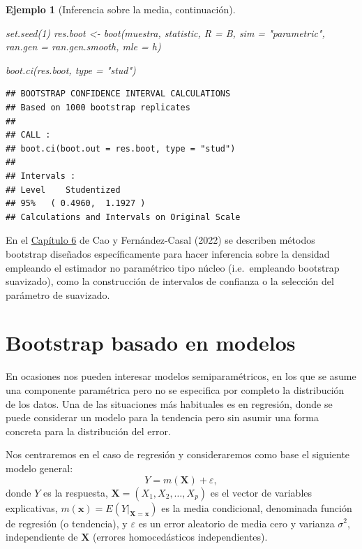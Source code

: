 \documentclass[
]{book}
\newenvironment{Shaded}{\begin{snugshade}}{\end{snugshade}}
\newcommand{\AttributeTok}[1]{\textcolor[rgb]{0.77,0.63,0.00}{#1}}
\newcommand{\DecValTok}[1]{\textcolor[rgb]{0.00,0.00,0.81}{#1}}
\newcommand{\FunctionTok}[1]{\textcolor[rgb]{0.00,0.00,0.00}{#1}}
\newcommand{\NormalTok}[1]{#1}
\newcommand{\OtherTok}[1]{\textcolor[rgb]{0.56,0.35,0.01}{#1}}
\newcommand{\StringTok}[1]{\textcolor[rgb]{0.31,0.60,0.02}{#1}}
\theoremstyle{break}
\newtheorem{example}{Ejemplo}[chapter]
\theoremstyle{nonumberplain}
\begin{document}
\begin{example}[Inferencia sobre la media, continuación]
\begin{Shaded}
\begin{Highlighting}[]
\FunctionTok{set.seed}\NormalTok{(}\DecValTok{1}\NormalTok{)}
\NormalTok{res.boot }\OtherTok{\textless{}{-}} \FunctionTok{boot}\NormalTok{(muestra, statistic, }\AttributeTok{R =}\NormalTok{ B, }\AttributeTok{sim =} \StringTok{"parametric"}\NormalTok{,}
                 \AttributeTok{ran.gen =}\NormalTok{ ran.gen.smooth, }\AttributeTok{mle =}\NormalTok{ h)}

\FunctionTok{boot.ci}\NormalTok{(res.boot, }\AttributeTok{type =} \StringTok{"stud"}\NormalTok{)}
\end{Highlighting}
\end{Shaded}

\begin{verbatim}
## BOOTSTRAP CONFIDENCE INTERVAL CALCULATIONS
## Based on 1000 bootstrap replicates
## 
## CALL : 
## boot.ci(boot.out = res.boot, type = "stud")
## 
## Intervals : 
## Level    Studentized     
## 95%   ( 0.4960,  1.1927 )  
## Calculations and Intervals on Original Scale
\end{verbatim}

\end{example}

En el \href{https://rubenfcasal.github.io/book_remuestreo/npden.html}{Capítulo 6} de Cao y Fernández-Casal (2022) se describen métodos bootstrap diseñados específicamente para hacer inferencia sobre la densidad empleando el estimador no paramétrico tipo núcleo (i.e.~empleando bootstrap suavizado), como la construcción de intervalos de confianza o la selección del parámetro de suavizado.

\hypertarget{boot-reg}{%
\section{Bootstrap basado en modelos}\label{boot-reg}}

En ocasiones nos pueden interesar modelos semiparamétricos, en los que se asume una componente paramétrica pero no se especifica por completo la distribución de los datos.
Una de las situaciones más habituales es en regresión, donde se puede considerar un modelo para la tendencia pero sin asumir una forma concreta para la distribución del error.

Nos centraremos en el caso de regresión y consideraremos como base el siguiente modelo general:
\begin{equation} 
  Y = m(\mathbf{X}) + \varepsilon,
  \label{eq:modelogeneral}
\end{equation}
donde \(Y\) es la respuesta, \(\mathbf{X}=(X_1, X_2, \ldots, X_p)\) es el vector de variables explicativas, \(m(\mathbf{x}) = E\left( \left. Y\right\vert_{\mathbf{X}=\mathbf{x}} \right)\) es la media condicional, denominada función de regresión (o tendencia), y \(\varepsilon\) es un error aleatorio de media cero y varianza \(\sigma^2\), independiente de \(\mathbf{X}\) (errores homocedásticos independientes).
\end{document}
